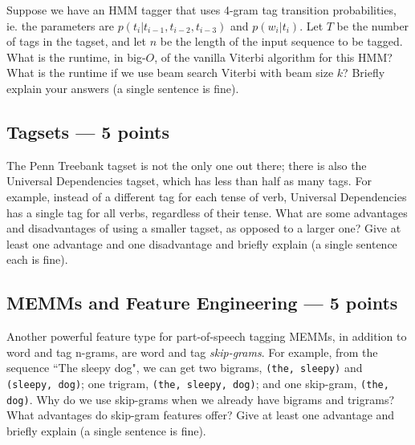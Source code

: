 \documentclass[12pt,a4paper]{article}
\begin{document}
Suppose we have an HMM tagger that uses 4-gram tag transition probabilities, ie. the parameters are $p(t_i | t_{i-1}, t_{i-2}, t_{i-3})$ and $p(w_i | t_i)$. Let $T$ be the number of tags in the tagset, and let $n$ be the length of the input sequence to be tagged. What is the runtime, in big-$O$, of the vanilla Viterbi algorithm for this HMM? What is the runtime if we use beam search Viterbi with beam size $k$? Briefly explain your answers (a single sentence is fine).

\subsection{Tagsets --- 5 points}

The Penn Treebank tagset is not the only one out there; there is also the Universal Dependencies tagset, which has less than half as many tags. For example, instead of a different tag for each tense of verb, Universal Dependencies has a single tag for all verbs, regardless of their tense. What are some advantages and disadvantages of using a smaller tagset, as opposed to a larger one? Give at least one advantage and one disadvantage and briefly explain (a single sentence each is fine).

\subsection{MEMMs and Feature Engineering --- 5 points}

Another powerful feature type for part-of-speech tagging MEMMs, in addition to word and tag n-grams, are word and tag \textit{skip-grams}. For example, from the sequence ``The sleepy dog", we can get two bigrams, {\tt (the, sleepy)} and {\tt (sleepy, dog)}; one trigram, {\tt (the, sleepy, dog)}; and one skip-gram, {\tt (the, dog)}. Why do we use skip-grams when we already have bigrams and trigrams? What advantages do skip-gram features offer? Give at least one advantage and briefly explain (a single sentence is fine).
\end{document}
